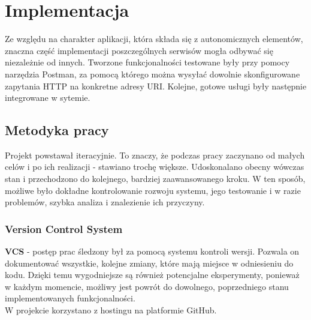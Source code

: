 \chapter{Implementacja}
\label{cha:implementacja}

Ze względu na charakter aplikacji, która składa się z autonomicznych elementów, znaczna część implementacji poszczególnych serwisów mogła odbywać się niezależnie od innych. Tworzone funkcjonalności testowane były przy pomocy narzędzia Postman, za pomocą którego można wysyłać dowolnie skonfigurowane zapytania HTTP na konkretne adresy URI. Kolejne, gotowe usługi były następnie integrowane w sytemie.


\section{Metodyka pracy}
Projekt powstawał iteracyjnie. To znaczy, że podczas pracy zaczynano od małych celów i po ich realizacji - stawiano trochę większe. Udoskonalano obecny wówczas stan i przechodzono do kolejnego, bardziej zaawansowanego kroku. W ten sposób, możliwe było dokładne kontrolowanie rozwoju systemu, jego testowanie i w razie problemów, szybka analiza i znalezienie ich przyczyny. 

\subsection{Version Control System}
\textbf{VCS} - postęp prac śledzony był za pomocą systemu kontroli wersji.
Pozwala on dokumentować wszystkie, kolejne zmiany, które mają miejsce w odniesieniu do kodu. Dzięki temu wygodniejsze są również potencjalne eksperymenty, ponieważ w każdym momencie, możliwy jest powrót do dowolnego, poprzedniego stanu implementowanych funkcjonalności.\cite{vcs}\\
W projekcie korzystano z hostingu na platformie GitHub.
\newpage
